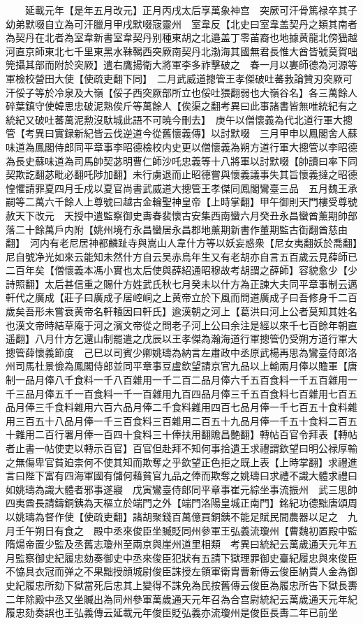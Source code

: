 　　延載元年【是年五月改元】正月丙戌太后享萬象神宫　突厥可汗骨篤禄卒其子幼弟默啜自立為可汗臘月甲戌默啜宼靈州　室韋反【北史曰室韋盖契丹之類其南者為契丹在北者為室韋新書室韋契丹别種東胡之北邉盖丁零苖裔也地據黄龍北傍峱越河直京師東北七千里東黑水靺鞨西突厥南契丹北渤海其國無君長惟大酋皆號莫賀咄筦攝其部而附於突厥】遣右鷹揚衛大將軍李多祚擊破之　春一月以婁師德為河源等軍檢校營田大使【使疏吏翻下同】　二月武威道摠管王孝傑破吐蕃㪍論贊刃突厥可汗俀子等於冷泉及大嶺【俀子西突厥部所立也俀吐猥翻弱也大嶺谷名】各三萬餘人碎葉鎮守使韓思忠破泥熟俟斤等萬餘人【俟渠之翻考異曰此事諸書皆無唯統紀有之統紀又破吐蕃萬泥勲沒馱城此語不可暁今刪去】　庚午以僧懷義為代北道行軍大摠管【考異曰實録新紀皆云伐逆道今從舊懷義傳】以討默啜　三月甲申以鳳閣舍人蘇味道為鳳閣侍郎同平章事李昭德檢校内史更以僧懷義為朔方道行軍大摠管以李昭德為長史蘇味道為司馬帥契苾明曹仁師沙吒忠義等十八將軍以討默啜【帥讀曰率下同契欺訖翻苾毗必翻吒陟加翻】未行虜退而止昭德嘗與懷義議事失其旨懷義撻之昭德惶懼請罪夏四月壬戍以夏官尚書武威道大摠管王孝傑同鳳閣鸞臺三品　五月魏王承嗣等二萬六千餘人上尊號曰越古金輪聖神皇帝【上時掌翻】甲午御則天門樓受尊號赦天下改元　天授中遣監察御史夀春裴懷古安集西南蠻六月癸丑永昌蠻酋薰期帥部落二十餘萬戶内附【姚州境冇永昌蠻居永昌郡地薰期新書作董期監古衘翻酋慈由翻】　河内有老尼居神都麟趾寺與嵩山人韋什方等以妖妄惑衆【尼女夷翻妖於喬翻】尼自號净光如來云能知未然什方自云吴赤烏年生又有老胡亦自言五百歲云見薛師已二百年矣【僧懷義本馮小實也太后使與薛紹通昭穆故考胡謂之薛師】容貌愈少【少詩照翻】太后甚信重之賜什方姓武氏秋七月癸未以什方為正諫大夫同平章事制云邁軒代之廣成【莊子曰廣成子居崆峒之上黄帝立於下風而問道廣成子曰吾修身千二百歲矣吾形未嘗衰黄帝名軒轅因曰軒氏】逾漢朝之河上【葛洪曰河上公者莫知其姓名也漢文帝時結草庵于河之濱文帝從之問老子河上公曰余注是經以來千七百餘年朝直遥翻】八月什方乞還山制罷遣之戊辰以王孝傑為瀚海道行軍摠管仍受朔方道行軍大摠管薛懷義節度　己巳以司賓少卿姚璹為納言左肅政中丞原武楊再思為鸞臺侍郎洛州司馬杜景儉為鳳閣侍郎並同平章事豆盧欽望請京官九品以上輸兩月俸以贍軍【唐制一品月俸八千食料一千八百雜用一千二百二品月俸六千五百食料一千五百雜用一千三品月俸五千一百食料一千一百雜用九百四品月俸三千五百食料七百雜用七百五品月俸三千食料雜用六百六品月俸二千食料雜用四百七品月俸一千七百五十食料雜用三百五十八品月俸一千三百食料三百雜用二百五十九品月俸一千五十食料二百五十雜用二百行署月俸一百四十食料三十俸扶用翻贍昌艶翻】轉帖百官令拜表【轉帖者止書一帖使吏以轉示百官】百官但赴拜不知何事拾遺王求禮謂欽望曰明公禄厚輸之無傷卑官貧廹柰何不使其知而欺奪之乎欽望正色拒之既上表【上時掌翻】求禮進言曰陛下富有四海軍國有儲何藉貧官九品之俸而欺奪之姚璹曰求禮不識大體求禮曰如姚璹為識大體者邪事遂寢　戊寅鸞臺侍郎同平章事崔元綜坐事流振州　武三思帥四夷酋長請鑄銅銕為天樞立於端門之外【端門洛陽皇城正南門】銘紀功德黜唐頌周以姚璹為督作使【使疏吏翻】諸胡聚錢百萬億買銅銕不能足賦民間農器以足之　九月壬午朔日有食之　殿中丞來俊臣坐贓貶同州參軍王弘義流瓊州【曹魏初置殿中監隋煬帝置少監及丞舊志瓊州至兩京與崖州道里相類　考異曰統紀云萬歲通天元年五月監察御史紀履忠劾奏御史中丞來俊臣犯狀有五請下獄理罪御史臺紀履忠與來俊臣不恊具衣冠而弹之不果黜授顔城尉俊臣誅授左領軍衛胄曹新傳云俊臣納賈人金為御史紀履忠所劾下獄當死后忠其上變得不誅免為民按舊傳云俊臣為履忠所告下獄長夀二年除殿中丞又坐贓出為同州參軍萬歲通天元年召為合宫尉統紀云萬歲通天元年紀履忠劾奏誤也王弘義傳云延載元年俊臣貶弘義亦流瓊州是俊臣長夀二年已前坐